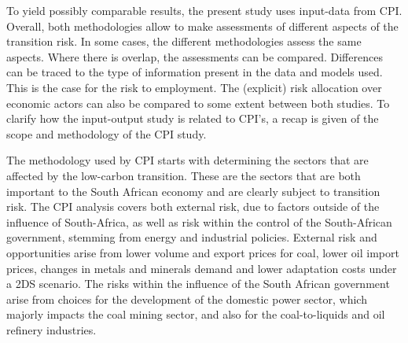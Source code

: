 \documentclass[12pt,english]{article}
\begin{document}
To yield possibly comparable results, the present study uses input-data from CPI.
Overall, both methodologies allow to make assessments of different aspects of the transition risk. In some cases, the different methodologies assess the same aspects. %
Where there is overlap, the assessments can be compared. Differences can be traced to the type of information present in the data and models used. This is the case for the risk %
to employment. %
The (explicit) risk allocation over economic actors can also be compared to some extent between both studies. %
To clarify how the input-output study is related to CPI's, a recap is given of the scope and methodology of the CPI study. 

The methodology used by CPI starts with determining the sectors that are affected by the low-carbon transition. These are the sectors that are both important to the South African economy and are clearly subject to transition risk. 
The CPI analysis covers both external risk, due to factors outside of the influence of South-Africa, as well as risk within the control of the South-African government, stemming from energy and industrial policies. External risk and opportunities arise from lower volume and export prices for coal, lower oil import prices, changes in metals and minerals demand and lower adaptation costs under a 2DS scenario.
The risks within the influence of the South African government arise from choices for the development of the domestic power sector, which majorly impacts the coal mining sector, and also for the coal-to-liquids and oil refinery industries. 
\end{document}
